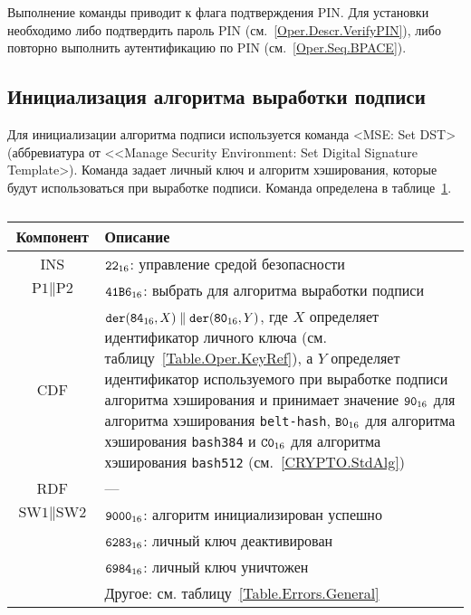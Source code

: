 Выполнение команды приводит к  флага подтверждения PIN.
Для установки  необходимо либо подтвердить пароль PIN 
(см.~\ref{Oper.Descr.VerifyPIN}), либо повторно выполнить аутентификацию по PIN 
(см.~\ref{Oper.Seq.BPACE}). 


\subsection{Инициализация алгоритма выработки подписи}
\label{Oper.Descr.SetDST}

Для инициализации алгоритма подписи используется команда     
<MSE: Set DST> (аббревиатура от <<Manage Security Environment: Set 
Digital Signature Template>). Команда задает личный ключ и алгоритм
хэширования, которые будут использоваться при выработке подписи.
%
Команда определена в таблице~\ref{Table.Oper.SetDSTCmd}.

\begin{table}[hbt]
\caption{}\label{Table.Oper.SetDSTCmd}
\begin{tabular}{|c|p{14cm}|}
\hline
Компонент & Описание \\
\hline
\hline
INS & $\texttt{22}_{16}$: управление средой безопасности\\ 
\hline
$\text{P1} \parallel\text{P2}$ & $\texttt{41B6}_{16}$: 
выбрать для алгоритма выработки подписи \\
\hline
CDF & 
$\texttt{der}(\texttt{84}_{16}, X) \parallel \texttt{der}(\texttt{80}_{16}, Y)$, 
где $X$ определяет идентификатор личного ключа (см. таблицу~\ref{Table.Oper.KeyRef}), 
а $Y$ определяет идентификатор используемого при выработке
подписи алгоритма хэширования 
и принимает значение $\texttt{90}_{16}$ для алгоритма хэширования \texttt{belt-hash},  
$\texttt{B0}_{16}$ для алгоритма хэширования \texttt{bash384} и 
$\texttt{C0}_{16}$ для алгоритма хэширования \texttt{bash512} (см.~\ref{CRYPTO.StdAlg})\\
\hline 
RDF &  --- \\
\hline
$\text{SW1} \parallel \text{SW2}$ & 
$\texttt{9000}_{16}$: алгоритм инициализирован успешно \\
\cline{2-2}
  & $\texttt{6283}_{16}$: личный ключ деактивирован \\
\cline{2-2}
  & $\texttt{6984}_{16}$: личный ключ уничтожен \\
\cline{2-2}
  & Другое: см. таблицу~\ref{Table.Errors.General} \\
\hline
\end{tabular}
\end{table}

